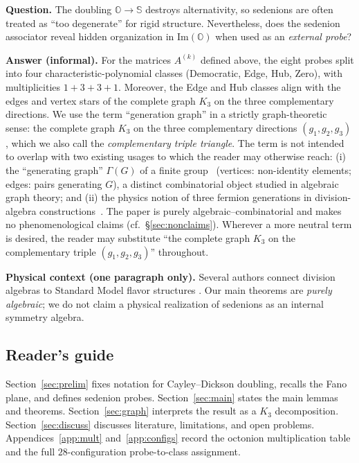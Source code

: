 \documentclass[12pt,a4paper]{article}
\begin{document}
\medskip
\noindent\textbf{Question.}
The doubling $\mathbb{O}\to\mathbb{S}$ destroys alternativity, so sedenions are often treated as ``too degenerate'' for rigid structure.
Nevertheless, does the sedenion associator reveal hidden organization in $\mathrm{Im}(\mathbb{O})$ when used as an \emph{external probe}?

\medskip
\noindent\textbf{Answer (informal).}
For the matrices $A^{(k)}$ defined above, the eight probes split into four characteristic-polynomial classes (Democratic, Edge, Hub, Zero), with multiplicities $1+3+3+1$.
Moreover, the Edge and Hub classes align with the edges and vertex stars of the complete graph $K_3$ on the three complementary directions.
We use the term ``generation graph'' in a strictly graph-theoretic sense: the complete graph $K_3$ on the three complementary directions $(g_1, g_2, g_3)$, which we also call the \emph{complementary triple triangle}. The term is not intended to overlap with two existing usages to which the reader may otherwise reach: (i) the ``generating graph'' $\Gamma(G)$ of a finite group~\cite{burness_guralnick_harper2018} (vertices: non-identity elements; edges: pairs generating $G$), a distinct combinatorial object studied in algebraic graph theory; and (ii) the physics notion of three fermion generations in division-algebra constructions~\cite{Furey2018,gresnigt2019,gresnigt2023,gourlay_gresnigt2024}. The paper is purely algebraic--combinatorial and makes no phenomenological claims (cf.~\S\ref{sec:nonclaims}). Wherever a more neutral term is desired, the reader may substitute ``the complete graph $K_3$ on the complementary triple $(g_1, g_2, g_3)$'' throughout.

\medskip
\noindent\textbf{Physical context (one paragraph only).}
Several authors connect division algebras to Standard Model flavor structures \cite{Dixon1994book,Furey2018,Boyle2020}.
Our main theorems are \emph{purely algebraic}; we do not claim a physical realization of sedenions as an internal symmetry algebra.

\subsection{Reader's guide}
Section~\ref{sec:prelim} fixes notation for Cayley--Dickson doubling, recalls the Fano plane, and defines sedenion probes.
Section~\ref{sec:main} states the main lemmas and theorems.
Section~\ref{sec:graph} interprets the result as a $K_3$ decomposition.
Section~\ref{sec:discuss} discusses literature, limitations, and open problems.
Appendices~\ref{app:mult} and~\ref{app:configs} record the octonion multiplication table and the full $28$-configuration probe-to-class assignment.
\end{document}
